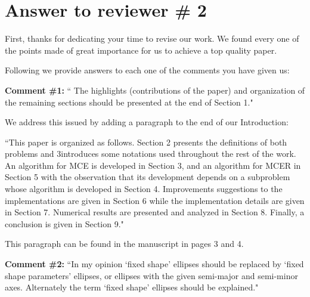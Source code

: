 
		
%
		
		\section*{Answer to reviewer \# 2}
		First, thanks for dedicating your time to revise our work. We found every one of the points made of great importance for us to achieve a top quality paper.
		
		Following we provide answers to each one of the comments you have given us:
		
		\textbf{Comment \#1:} `` The highlights (contributions of the paper) and organization of the remaining sections should be presented at the end of Section 1."
		
		We address this issued by adding a paragraph to the end of our Introduction:
		
		``This paper is organized as follows. Section 2 presents the definitions of both problems and
		3introduces some notations used throughout the rest of the work. An algorithm for MCE is developed
		in Section 3, and an algorithm for MCER in Section 5 with the observation that its development
		depends on a subproblem whose algorithm is developed in Section 4. Improvements suggestions to
		the implementations are given in Section 6 while the implementation details are given in Section 7.
		Numerical results are presented and analyzed in Section 8. Finally, a conclusion is given in Section 9."
		
		This paragraph can be found in the manuscript in pages 3 and 4.
		
		\textbf{Comment \#2:} ``In my opinion `fixed shape' ellipses should be replaced by `fixed shape parameters' ellipses, or ellipses with the given semi-major and semi-minor axes. Alternately the term `fixed shape' ellipses should be explained."
		
